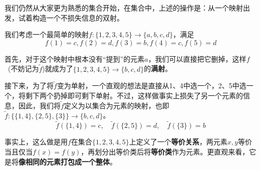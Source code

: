 \documentclass[a4paper,UTF8,fontset=windows]{ctexart}
\newcommand*{\note}{\noindent *}
\begin{document}
我们仍然从大家更为熟悉的集合开始，在集合中，上述的操作是：从一个映射出发，试着构造一个不损失信息的双射。

我们考虑一个最简单的映射$f:\{1,2,3,4,5\}\to\{a,b,c,d\}$，满足
$$f(1)=c,f(2)=d,f(3)=b,f(4)=c,f(5)=d$$

首先，对于这个映射中根本没有``提到''的元素$a$，我们可以直接把它删掉，这样$f$\ (不妨记为$\tilde{f}$)就成为了$\{1,2,3,4,5\}\to\{b,c,d\}$的\textbf{满射}。

接下来，为了将$\tilde{f}$变为单射，一个直观的想法是直接从1、4中选一个，2、5中选一个，将剩下两个扔掉即可剩下单射。不过，这样做事实上损失了另一个元素的信息，因此，我们将$\tilde{f}$定义为以集合为元素的映射，也即$\tilde{f}:\{\{1,4\},\{2,5\},\{3\}\}\to\{b,c,d\}$。
$$\tilde{f}(\{1,4\})=c,\quad\tilde{f}(\{2,5\})=d,\quad\tilde{f}(\{3\})=b$$

\note 事实上，这么做是用$f$在集合$\{1,2,3,4,5\}$上定义了一个\textbf{等价关系}，两元素$x,y$等价当且仅当$f(x)=f(y)$，再划分出等价类后将\textbf{等价类}作为元素。更直观来看，它是将\textbf{像相同的元素打包成一个整体}。

\
\end{document}
